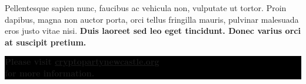 \documentclass[10.5pt,a4paper]{article} %
\begin{document}
\begin{multicols*}{2}
Pellentesque sapien nunc, faucibus ac vehicula non, vulputate ut tortor. Proin dapibus, magna non auctor porta, orci tellus fringilla mauris, pulvinar malesuada eros justo vitae nisi. \textbf {Duis laoreet sed leo eget tincidunt. Donec varius orci at suscipit pretium.} %




\begin{center}
	\vfill %
	\colorbox{Black}{
		\begin{minipage}{8cm}
			\color{white}
			\vspace{0.2cm}
			\begin{center}
				\textbf{{\Large Please visit \url{cryptopartynewcastle.org}\\for more information.}}
			\end{center}
			\vspace{0.2cm}
		\end{minipage}
	}
\end{center}

\vspace{0.75cm}

\end{multicols*}
\end{document}

